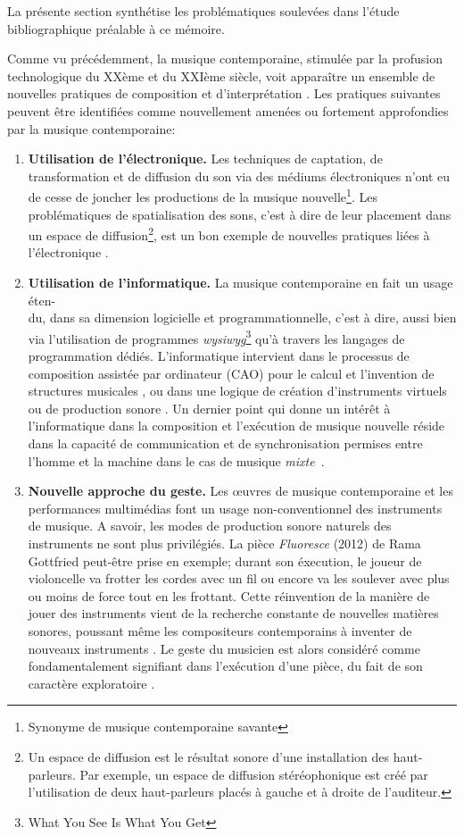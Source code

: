 La présente section synthétise les problématiques soulevées dans l'étude bibliographique préalable à ce mémoire.

Comme vu précédemment, la musique contemporaine, stimulée par la profusion technologique du XXème et du XXIème siècle, voit apparaître un ensemble de nouvelles pratiques de composition et d'interprétation \cite{bosseur2005}.
Les pratiques suivantes peuvent être identifiées comme nouvellement amenées ou fortement approfondies par la musique contemporaine:

\begin{enumerate}[label={(\arabic*)}]
	\item \textbf{Utilisation de l'électronique.} Les techniques de captation, de transformation et de diffusion du son via des médiums électroniques n'ont eu de cesse de joncher les productions de la musique nouvelle\footnote{Synonyme de musique contemporaine savante}.
	Les problématiques de spatialisation des sons, c'est à dire de leur placement dans un espace de diffusion\footnote{Un espace de diffusion est le résultat sonore d'une installation des haut-parleurs. Par exemple, un espace de diffusion stéréophonique est créé par l'utilisation de deux haut-parleurs placés à gauche et à droite de l'auditeur.}, est un bon exemple de nouvelles pratiques liées à l'électronique \cite{harley1993}.
	
	\item \textbf{Utilisation de l'informatique.} La musique contemporaine en fait un usage éten-\\du, dans sa dimension logicielle et programmationnelle, c'est à dire, aussi bien via l'utilisation de programmes \textit{wysiwyg}\footnote{What You See Is What You Get} qu'à travers les langages de programmation dédiés. L'informatique intervient dans le processus de composition assistée par ordinateur (CAO) pour le calcul et l'invention de structures musicales \cite{agon1998}, ou dans une logique de création d'instruments virtuels ou de production sonore \cite{puckette1991, mccartney1996}. Un dernier point qui donne un intérêt à l'informatique dans la composition et l'exécution de musique nouvelle réside dans la capacité de communication et de synchronisation permises entre l'homme et la machine dans le cas de musique \textit{mixte}~\cite{cont2008}.
	
	\item \textbf{Nouvelle approche du geste.} Les œuvres de musique contemporaine et les performances multimédias font un usage non-conventionnel des instruments de musique. A savoir, les modes de production sonore naturels des instruments ne sont plus privilégiés. La pièce \textit{Fluoresce} (2012) de Rama Gottfried peut-être prise en exemple; durant son éxecution, le joueur de violoncelle va frotter les cordes avec un fil ou encore va les soulever avec plus ou moins de force tout en les frottant. Cette réinvention de la manière de jouer des instruments vient de la recherche constante de nouvelles matières sonores, poussant même les compositeurs contemporains à inventer de nouveaux instruments . Le geste du musicien est alors considéré comme fondamentalement signifiant dans l'exécution d'une pièce, du fait de son caractère exploratoire \cite{zanpronha2005}.
	

\end{enumerate}
